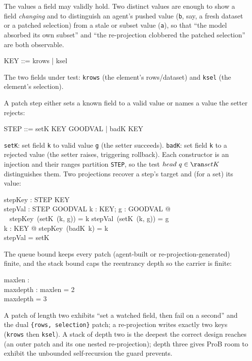 \documentclass[a4paper,10pt,fleqn]{article}
\begin{document}
The values a field may validly hold.  Two distinct values are enough to show a
field \emph{changing} and to distinguish an agent's pushed value (\texttt{b},
say, a fresh dataset or a patched selection) from a stale or subset value
(\texttt{a}), so that ``the model absorbed its own subset'' and ``the
re-projection clobbered the patched selection'' are both observable.

\begin{zed}
  KEY ::= krows | ksel
\end{zed}

The two fields under test: \texttt{krows} (the element's rows/dataset) and
\texttt{ksel} (the element's selection).

A patch step either sets a known field to a valid value or names a value the
setter rejects:

\begin{zed}
  STEP ::= setK \ldata KEY \cross GOODVAL \rdata | badK \ldata KEY \rdata
\end{zed}

\texttt{setK}: set field \texttt{k} to valid value \texttt{g} (the setter
succeeds).  \texttt{badK}: set field \texttt{k} to a rejected value (the setter
raises, triggering rollback).  Each constructor is an injection and their ranges
partition \texttt{STEP}, so the test $head~q \in \ran setK$ distinguishes them.
Two projections recover a step's target and (for a set) its value:

\begin{axdef}
  stepKey : STEP \fun KEY \\
  stepVal : STEP \pfun GOODVAL
\where
  \forall k : KEY; g : GOODVAL @ \\
  \quad~ stepKey~(setK~(k, g)) = k \land stepVal~(setK~(k, g)) = g \\
  \forall k : KEY @ stepKey~(badK~k) = k \\
  \dom stepVal = \ran setK
\end{axdef}

The queue bound keeps every patch (agent-built or re-projection-generated)
finite, and the stack bound caps the reentrancy depth so the carrier is finite:

\begin{axdef}
  maxlen : \nat \\
  maxdepth : \nat
\where
  maxlen = 2 \\
  maxdepth = 3
\end{axdef}

A patch of length two exhibits ``set a watched field, then fail on a second'' and
the dual \texttt{\{rows, selection\}} patch; a re-projection writes exactly two
keys (\texttt{krows} then \texttt{ksel}).  A stack of depth two is the deepest the
correct design reaches (an outer patch and its one nested re-projection); depth
three gives ProB room to exhibit the unbounded self-recursion the guard prevents.
\end{document}
